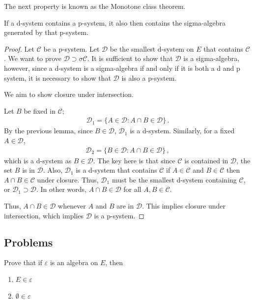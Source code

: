 The next property is known as the Monotone class theorem. 
\begin{definition}
	If a d-system contains a p-system, it also then contains the sigma-algebra generated by that p-system.
	\begin{proof}
		Let $\mathcal{C}$ be a p-system. Let $\mathcal{D}$ be the smallest d-system on $E$ that contains $\mathcal{C}$. We want to prove $\mathcal{D} \supset \sigma\mathcal{C}$.
		It is sufficient to show that $\mathcal{D}$ is a sigma-algebra, however, since a d-system is a sigma-algebra if and only if it is both a d and p system, it is necessary to show that $\mathcal{D}$ is also a p-system.

		We aim to show closure under intersection.

		Let $B$ be fixed in $\mathcal{C}$;
		\begin{align*}
			\mathcal{D}_1 = \{A \in \mathcal{D}: A \cap B \in \mathcal{D}\}\,.
		\end{align*}
		By the previous lemma, since $B\in \mathcal{D}$, $\mathcal{D}_1$ is a d-system.
		Similarly, for a fixed $A \in \mathcal{D}$,
		\begin{align*}
			\mathcal{D}_2 = \{B \in \mathcal{D}: A \cap B \in \mathcal{D}\}\,,
		\end{align*}
		which is a d-system as $B \in \mathcal{D}$. The key here is that since $\mathcal{C}$ is contained in $\mathcal{D}$, the set $B$ is in $\mathcal{D}$. Also, $\mathcal{D}_1$ is a d-system that contains $\mathcal{C}$ if $A\in \mathcal{C}$ and $B \in \mathcal{C}$ then $A\cap B \in \mathcal{C}$ under closure. Thus, $\mathcal{D}_1$ must be the smallest  d-system containing $\mathcal{C}$, or $\mathcal{D}_1 \supset \mathcal{D}$. In other words, $A \cap B \in \mathcal{D}$ for all $A,B \in \mathcal{C}$.

		Thus, $A\cap B \in \mathcal{D}$ whenever $A$ and $B$ are in $\mathcal{D}$. This implies closure under intersection, which implies $\mathcal{D}$ is a p-system.
	\end{proof}
\end{definition}



\subsection{Problems}

\begin{problem}
	Prove that if $\varepsilon$ is an algebra on $E$, then 
	\begin{enumerate}
		\item $E \in \varepsilon$
		\item $\emptyset \in \varepsilon$
	\end{enumerate}
\end{problem}

